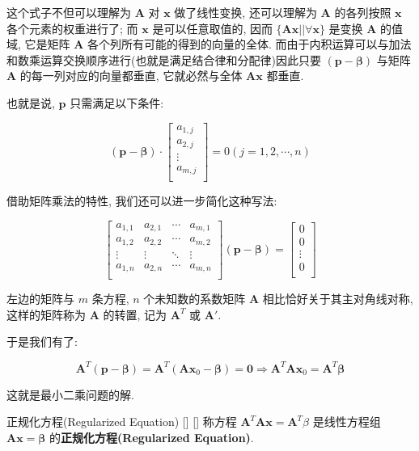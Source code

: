 \documentclass[UTF8]{ctexart}
\DeclareMathOperator{\0}{\mathbf{0}}
\DeclareMathOperator{\<}{\langle}
\renewcommand{\>}{\rangle}
\begin{document}
\begin{prf}
				这个式子不但可以理解为 \(\bm{A}\) 对 \(\bm{x}\) 做了线性变换, 还可以理解为 \(\bm{A}\) 的各列按照 \(\bm{x}\) 各个元素的权重进行了; 而 \(\bm{x}\) 是可以任意取值的, 因而 \(\{\bm{A}\bm{x}||\forall\bm{x}\}\) 是变换 \(\bm{A}\) 的值域, 它是矩阵 \(\bm{A}\) 各个列所有可能的 得到的向量的全体. 而由于内积运算可以与加法和数乘运算交换顺序进行(也就是满足结合律和分配律)因此只要 \((\bm{p}-\bm{\beta})\) 与矩阵 \(\bm{A}\) 的每一列对应的向量都垂直, 它就必然与全体 \(\bm{A}\bm{x}\) 都垂直. 
				
				也就是说,  \(\bm{p}\) 只需满足以下条件: 
				
				\[
				(\bm{p}-\bm{\beta})\cdot\begin{bmatrix}
				a_{1,j}\\
				a_{2,j}\\
				\vdots\\
				a_{m,j}\\
				\end{bmatrix}=0(j=1,2,\cdots,n)
				\]
				
				借助矩阵乘法的特性, 我们还可以进一步简化这种写法: 

				\[
				\begin{bmatrix}
					a_{1,1} & a_{2,1} & \cdots & a_{m,1}\\
					a_{1,2} & a_{2,2} & \cdots & a_{m,2}\\
					\vdots & \vdots & \ddots & \vdots\\
					a_{1,n} & a_{2,n} & \cdots & a_{m,n}\\
				\end{bmatrix}
				(\bm{p}-\bm{\beta})=
				\begin{bmatrix}
				0\\
				0\\
				\vdots\\
				0\\
				\end{bmatrix}
				\]
				
				左边的矩阵与 \(m\) 条方程,  \(n\) 个未知数的系数矩阵 \(\bm{A}\) 相比恰好关于其主对角线对称, 这样的矩阵称为 \(\bm{A}\) 的转置, 记为 \(\bm{A}^T\) 或 \(\bm{A}'\). 
				
				于是我们有了: 
				
				\[\bm{A}^T(\bm{p}-\bm{\beta})=\bm{A}^T(\bm{A}\bm{x}_0-\bm{\beta})=\mathbf{0}\Longrightarrow \bm{A}^T\bm{A}\bm{x}_0=\bm{A}^T\bm{\beta}\]
				
				这就是最小二乘问题的解.
		\end{prf} 

		\begin{dfn}
			[]
			{正规化方程(Regularized Equation)}
			[]
			[]
			称方程 \(\bm{A}^T\bm{A} \bm{x}=\bm{A}^T\beta\) 是线性方程组 \(\bm{A}\bm{x}=\bm{\beta}\) 的\textbf{正规化方程(Regularized Equation)}. 
		\end{dfn}
\end{document}
